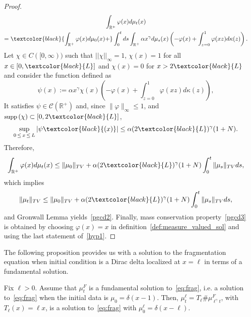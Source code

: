 \documentclass[10pt]{amsart}
\theoremstyle{definition}\newtheorem{defi}[theo]{Definition}\newtheorem{rema}[theo]{Remark}\newtheorem{exam}[theo]{Example}\newtheorem{exem}[theo]{Example}\newtheorem{nota}[theo]{Notation}
\newcommand*\dst{\displaystyle}
\newcommand*\R{\mathbb{R}}
\newcommand{\clC}{\mathcal{C}}
\newcommand{\MT}[1]{\textcolor{black}{#1}}
\newcommand*\supp{{\mbox{\small\rm supp}}\,}
\begin{document}
\begin{proof}
\begin{multline*}
\int_{\R^+} \varphi(x) d\mu_t(x)\\
=\MT{\int_{\R^+} \varphi(x) d\mu_0(x)+}\dst\int_0^t ds \dst\int_{\R^+} \alpha x^{\gamma} d\mu_s(x) \left(- \varphi(x) + \dst\int_{z=0}^{1} \varphi(xz)d\kappa(z)\right).
\end{multline*}
Let $\chi\in C([0, \infty))$ such that $||\chi||_\infty=1$, $\chi(x)=1$ for all $x\in [0, \MT{L}]$ and $\chi(x)=0$ for $x>2\MT{L}$ and consider the function defined as
\begin{equation*}
\psi(x) := \alpha x^{\gamma}\chi(x) \left(- \varphi(x) + \dst\int_{z=0}^{1} \varphi(xz)d\kappa(z)\right),
\end{equation*}
It satisfies $ \psi \in \clC(\R^+)$ and, since $\|\varphi\|_{\infty} \leq 1$, and $\supp(\chi)\subset [0, 2 \MT{L}]$,
\begin{equation*}
\sup_{0\,\le\,x\,\le\,L} |\psi\MT{(x)}|\leq \alpha (2 \MT{L})^{\gamma} (1+N).
\end{equation*}
Therefore,
\begin{equation*}
\int_{\R^+} \varphi(x) d\mu_t(x)\leq \|\mu_0\|_{TV}+ \alpha (2\MT{L})^{\gamma} (1+N) \dst\int_0^t \|\mu_s\|_{TV} ds,
\end{equation*}
which implies
\begin{equation*}
\|\mu_t\|_{TV}\leq \|\mu_0\|_{TV}+ \alpha (2\MT{L})^{\gamma} (1+N) \dst\int_0^t \|\mu_s\|_{TV} ds,
\end{equation*}
and Gronwall Lemma yields~\eqref{pgcd2}. Finally, mass conservation property~\eqref{pgcd3} is obtained by choosing $\varphi(x)=x$ in definition~\ref{def:measure_valued_sol}
and using the last statement of~\eqref{hyp1}.
\end{proof}

The following proposition provides us with a solution to the fragmentation equation when initial condition is a Dirac delta localized at $x=\ell$ in terms of a fundamental solution.

\begin{prop}\label{prop:rescaling}
Fix $\ell>0$.
Assume that $\mu_t^{F}$ is a fundamental solution to~\eqref{eq:frag}, i.e. a solution to~\eqref{eq:frag} when the initial data is $\mu_0=\delta(x-1)$. Then, $\mu_t^{\ell} = T_{\ell} \# \mu_{\ell^{\gamma}t}^{F}$, with $T_{\ell}(x)= \ell x$, is a solution to~\eqref{eq:frag} with $\mu_0^{\ell}=\delta(x-\ell)$.
\end{prop}
\end{document}
